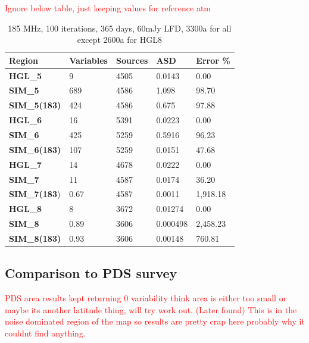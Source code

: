 \documentclass[a4paper, 10pt]{article}
\begin{document}
\textcolor{red}{Ignore below table, just keeping values for reference atm}
\begin{table}[H]
    \centering
\begin{tabular}{lllll}
    \toprule
    \textbf{Region}	&	\textbf{Variables}	&	\textbf{Sources}	&	\textbf{ASD}	&	\textbf{Error \%}	\\ \midrule
    \textbf{HGL\_5}	&	9	&	4505	&	0.0143	&	0.00	\\
    \textbf{SIM\_5}	&	689	&	4586	&	1.098	&	98.70	\\
    \textbf{SIM\_5(183)}	&	424	&	4586	&	0.675	&	97.88	\\\midrule
    									
    \textbf{HGL\_6}	&	16	&	5391	&	0.0223	&	0.00	\\
    \textbf{SIM\_6}	&	425	&	5259	&	0.5916	&	96.23	\\
    \textbf{SIM\_6(183)}	&	107	&	5259	&	0.0151	&	47.68	\\\midrule
    									
    \textbf{HGL\_7}	&	14	&	4678	&	0.0222	&	0.00	\\
    \textbf{SIM\_7}	&	11	&	4587	&	0.0174	&	36.20	\\
    \textbf{SIM\_7(183})	&	0.67	&	4587	&	0.0011	&	1,918.18	\\\midrule
    \textbf{HGL\_8}	&	8	&	3672	&	0.01274	&	0.00	\\
    \textbf{SIM\_8}	&	0.89	&	3606	&	0.000498	&	2,458.23	\\
    \textbf{SIM\_8(183)}	&	0.93	&	3606	&	0.00148	&	760.81	\\\bottomrule
\end{tabular}
    \label{tab:Hp}
    \caption{185 MHz, 100 iterations, 365 days, 60mJy LFD, 3300a for all except 2600a for HGL8}
\end{table}

\subsection{Comparison to PDS survey}
\textcolor{red}{PDS area results kept returning 0 variability think area is either too small or maybe its another latitude thing, will try work out. (Later found) This is in the noise dominated region of the map so results are pretty crap here probably why it couldnt find anything.}
\end{document}
